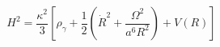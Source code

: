 \begin{equation}\label{sys4}
H^2=\frac{\kappa^2}{3}[\rho_\gamma+\frac{1}{2}(\dot{R}^2+\frac{\Omega^2}{a^6R^2})+V(R)]
\end{equation}

